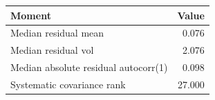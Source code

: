 \begin{tabular}{lr}
\toprule
Moment & Value \\
\midrule
Median residual mean & 0.076 \\
Median residual vol & 2.076 \\
Median absolute residual autocorr(1) & 0.098 \\
Systematic covariance rank & 27.000 \\
\bottomrule
\end{tabular}
